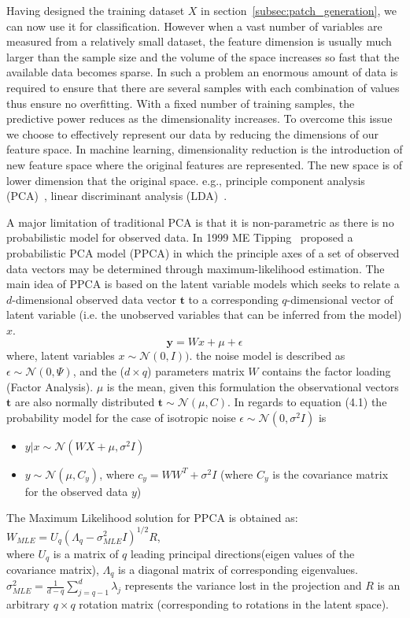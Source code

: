 Having designed the training dataset $ X $ in section~\ref{subsec:patch_generation}, we can now use it for classification. However when a vast number of variables are measured from a relatively small dataset, the feature dimension is usually much larger than the sample size and the volume of the space increases so fast that the available data becomes sparse. In such a problem an enormous amount of data is required to ensure that there are several samples with each combination of values thus ensure no overfitting. With a fixed number of training samples, the predictive power reduces as the dimensionality increases. To overcome this issue we choose to effectively represent our data by reducing the dimensions of our feature space. In machine learning, dimensionality reduction is the introduction of new feature space where the original features are represented. The new space is of lower dimension that the original space. e.g., principle component analysis (PCA)~\citep{jolliffe2002principal}, linear discriminant analysis (LDA)~\citep{mika1999fisher}.

 A major limitation of traditional PCA is that it is non-parametric as there is no probabilistic model for observed data. In 1999 ME Tipping~\citep*{tipping1999mixtures} proposed a probabilistic PCA model (PPCA) in which the principle axes of a set of observed data vectors may be determined through maximum-likelihood estimation. The main idea of PPCA is based on the latent variable models which seeks to relate a $ d $-dimensional observed data vector $ \mathbf{t} $ to a corresponding $ q $-dimensional vector of latent variable (i.e. the unobserved variables that can be inferred from the model) $ x $.
\begin{equation}
\mathbf{y} = Wx + \mu + \epsilon
\end{equation} 
where, latent variables $ x \sim \mathcal{N}(0,I)) $. the noise model is described as $ \epsilon \sim \mathcal{N}(0,\Psi) $, and the ($ d \times q $) parameters matrix $ W $ contains the factor loading (Factor Analysis). $ \mu $ is the mean, given this formulation the observational vectors $ \mathbf{t} $ are also normally distributed $ \mathbf{t} \sim \mathcal{N}(\mu,C) $. In regards to equation (4.1) the probability model for the case of isotropic noise $ \epsilon \sim \mathcal{N}(0,\sigma^2I) $ is 
\begin{itemize}
	\item $ y|x \sim \mathcal{N}(WX + \mu, \sigma^2I) $
	\item $ y \sim \mathcal{N}(\mu, C_y) $, where $ c_y = WW^T + \sigma^2I $ (where $C_y$ is the covariance matrix for the observed data $ y $)
\end{itemize}
The Maximum Likelihood solution for PPCA is obtained as: \\$W_{MLE} = U_q(\Lambda_q - \sigma_{MLE}^2I)^{1/2}R$, \\where $U_q$ is a matrix of $q$ leading principal directions(eigen values of the covariance matrix), $\Lambda_q$ is a diagonal matrix of corresponding eigenvalues. \\$\sigma_{MLE}^2 = \frac{1}{d-q}\sum_{j=q-1}^{d}\lambda_j$ represents the variance lost in the projection and $R$ is an arbitrary $q\times q$ rotation matrix (corresponding to rotations in the latent space). 

